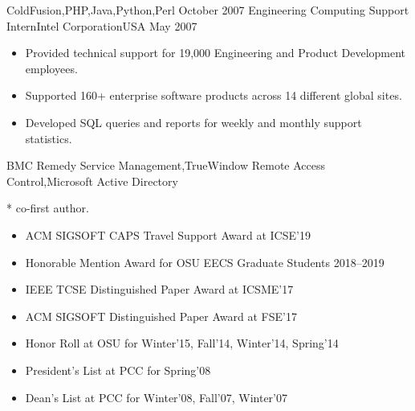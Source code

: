 \documentclass[localFont,alternative]{yaac-another-awesome-cv}
\begin{document}
\begin{experiences}
    {ColdFusion,PHP,Java,Python,Perl}
  \emptySeparator
  \experience
    {October 2007}  {Engineering Computing Support Intern}{Intel Corporation}{USA}
    {May 2007}      {
                      \begin{itemize}
                        \item Provided technical support for 19,000 Engineering and Product Development employees.
                        \item Supported 160+ enterprise software products across 14 different global sites.
                        \item Developed SQL queries and reports for weekly and monthly support statistics.
                      \end{itemize}
                    }
    {BMC Remedy Service Management,TrueWindow Remote Access Control,Microsoft Active Directory}
\end{experiences}

\smallskip
* co-first author.
\begingroup
\renewcommand{\section}[2]{}%
\nocite{*}


\endgroup

\twocolumnsectionright
{
\begin{skills}
\end{skills}}
{
\vspace{1em}
\begin{itemize}
  \item ACM SIGSOFT CAPS Travel Support Award at ICSE'19
  \item Honorable Mention Award for OSU EECS Graduate Students 2018--2019
  \item IEEE TCSE Distinguished Paper Award at ICSME'17
  \item ACM SIGSOFT Distinguished Paper Award at FSE'17
  \item Honor Roll at OSU for Winter'15, Fall'14, Winter'14, Spring'14
  \item President's List at PCC for Spring'08
  \item Dean's List at PCC for Winter'08, Fall'07, Winter'07
\end{itemize}
}
\end{document}
